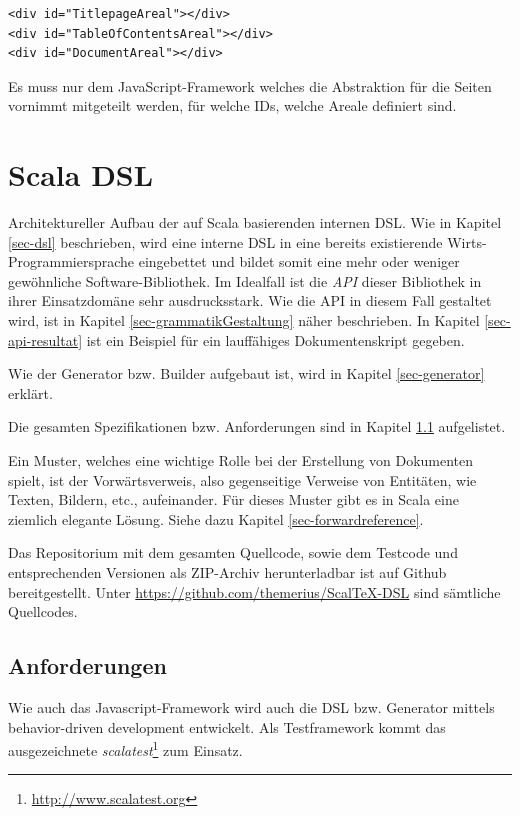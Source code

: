 \begin{verbatim}
<div id="TitlepageAreal"></div>
<div id="TableOfContentsAreal"></div>
<div id="DocumentAreal"></div>
\end{verbatim}

Es muss nur dem JavaScript-Framework welches die Abstraktion für die
Seiten vornimmt mitgeteilt werden, für welche IDs, welche Areale definiert
sind.


\section{Scala DSL}\label{sec-scalaDSL}

Architektureller Aufbau der auf Scala basierenden internen DSL. Wie in
Kapitel \ref{sec-dsl} beschrieben, wird eine interne DSL in eine bereits
existierende Wirts-Programmiersprache eingebettet und bildet somit
eine mehr oder weniger gewöhn\-liche Software-Bibliothek. Im Idealfall ist
die \emph{API} dieser Bibliothek in ihrer Einsatzdomäne sehr ausdrucksstark.
Wie die API in diesem Fall gestaltet wird, ist in Kapitel
\ref{sec-grammatikGestaltung} näher beschrieben. In Kapitel
\ref{sec-api-resultat} ist ein Beispiel für ein lauffähiges
Dokumentenskript gegeben.

Wie der Generator bzw. Builder aufgebaut ist, wird in
Kapitel \ref{sec-generator} erklärt.

Die gesamten Spezifikationen bzw. Anforderungen sind in Kapitel
\ref{sec-dsl_anforderungen} aufgelistet.

Ein Muster, welches eine wichtige Rolle bei der Erstellung von Dokumenten
spielt, ist der Vorwärtsverweis, also gegenseitige Verweise von Entitäten,
wie Texten, Bildern, etc., aufeinander. Für dieses Muster gibt es in Scala
eine ziemlich elegante Lösung. Siehe dazu Kapitel \ref{sec-forwardreference}.

Das Repositorium mit dem gesamten Quellcode, sowie dem Testcode
und entsprechenden Versionen als ZIP-Archiv herunterladbar ist auf Github bereitgestellt.
Unter \url{https://github.com/themerius/ScalTeX-DSL} sind sämtliche
Quellcodes.

\subsection{Anforderungen}\label{sec-dsl_anforderungen}

Wie auch das Javascript-Framework wird auch die DSL bzw. Generator
mittels behavior-driven development entwickelt. Als Testframework
kommt das ausgezeichnete
\emph{scalatest}\footnote{\url{http://www.scalatest.org}} zum Einsatz.

